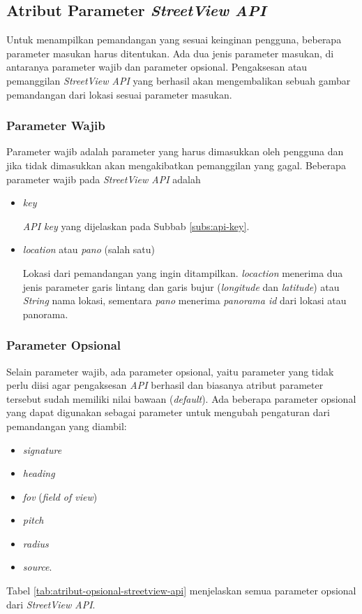 \subsection{Atribut Parameter {\it StreetView API}}
\label{subs:parameter}
Untuk menampilkan pemandangan yang sesuai keinginan pengguna, beberapa parameter masukan harus ditentukan. Ada dua jenis parameter masukan, di antaranya parameter wajib dan parameter opsional. Pengaksesan atau pemanggilan {\it StreetView API} yang berhasil akan mengembalikan sebuah gambar pemandangan dari lokasi sesuai parameter masukan. 

\subsubsection{Parameter Wajib}
Parameter wajib adalah parameter yang harus dimasukkan oleh pengguna dan jika tidak dimasukkan akan mengakibatkan pemanggilan yang gagal. 
Beberapa parameter wajib pada {\it StreetView API} adalah
\begin{itemize}
	\item \textit{key}
	
	\textit{API key} yang dijelaskan pada Subbab \ref{subs:api-key}.
	\item \textit{location} atau \textit{pano} (salah satu)
	 
	 Lokasi dari pemandangan yang ingin ditampilkan. \textit{locaction} menerima dua jenis parameter garis lintang dan garis bujur (\textit{longitude} dan \textit{latitude}) atau \textit{String} nama lokasi, sementara \textit{pano} menerima \textit{panorama id} dari lokasi atau panorama. 
	 
\end{itemize}   

\subsubsection{Parameter Opsional}
Selain parameter wajib, ada parameter opsional, yaitu parameter yang tidak perlu diisi agar pengaksesan {\it API} berhasil dan biasanya atribut parameter tersebut sudah memiliki nilai bawaan ({\it default}). Ada beberapa parameter opsional yang dapat digunakan sebagai parameter untuk mengubah pengaturan dari pemandangan yang diambil:
\begin{itemize}
	\item {\it signature}
	\item {\it heading}
	\item {\it fov} ({\it field of view})
	\item {\it pitch}
	\item {\it radius}
	\item {\it source}.
\end{itemize}
Tabel \ref{tab:atribut-opsional-streetview-api} menjelaskan semua parameter opsional dari \textit{StreetView API}.

